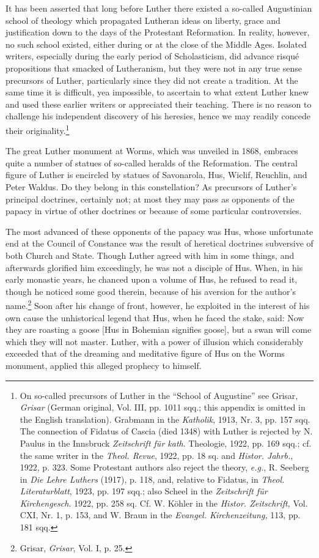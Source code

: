 It has been asserted that long before Luther there existed a so-called Augustinian
school of theology which propagated Lutheran
ideas on liberty, grace and justification down to the days of the
Protestant Reformation. In reality, however, no such school existed,
either during or at the close of the Middle Ages. Isolated writers,
especially during the early period of Scholasticism, did advance risqué
propositions that smacked of Lutheranism, but they were not in
any true sense precursors of Luther, particularly since they did not
create a tradition. At the same time it is difficult, yea impossible,
to ascertain to what extent Luther knew and used these earlier
writers or appreciated their teaching. There is no reason to challenge
his independent discovery of his heresies, hence we may readily concede
their originality.\footnote{On so-called precursors of Luther in the “School of Augustine” see Grisar, \textit{Grisar}
(German original, Vol. III, pp. 1011 sqq.; this appendix is omitted in the English translation).
Grabmann in the \textit{Katholik}, 1913, Nr. 3, pp. 157 sqq. The connection of Fidatus
of Cascia (died 1348) with Luther is rejected by N. Paulus in the Innsbruck \textit{Zeitschrift
für kath}. Theologie, 1922, pp. 169 sqq.; cf. the same writer in the \textit{Theol. Revue}, 1922,
pp. 18 sq. and \textit{Histor. Jahrb.}, 1922, p. 323. Some Protestant authors also reject the theory,
\textit{e.g.}, R. Seeberg in \textit{Die Lehre Luthers} (1917), p. 118, and, relative to Fidatus, in \textit{Theol.
Literaturblatt}, 1923, pp. 197 sqq.; also Scheel in the \textit{Zeitschrift für Kirchengesch}. 1922,
pp. 258 sq. Cf. W. Köhler in the \textit{Histor. Zeitschrift,} Vol. CXI, Nr. 1, p. 153, and W.
Braun in the \textit{Evangel. Kirchenzeitung,} 113, pp. 181 sqq.
}

The great Luther monument at Worms, which was unveiled in
1868, embraces quite a number of statues of so-called heralds of
the Reformation. The central figure of Luther is encircled by
statues of Savonarola, Hus, Wiclif, Reuchlin, and Peter Waldus.
Do they belong in this constellation? As precursors of Luther’s principal
doctrines, certainly not; at most they may pass as opponents
of the papacy in virtue of other doctrines or because of some particular
controversies.

The most advanced of these opponents of the papacy was Hus,
whose unfortunate end at the Council of Constance was the result
of heretical doctrines subversive of both Church and State. Though
Luther agreed with him in some things, and afterwards glorified him
exceedingly, he was not a disciple of Hus. When, in his early monastic
years, he chanced upon a volume of Hus, he refused to read
it, though he noticed some good therein, because of his aversion
for the author’s name.\footnote{Grisar, \textit{Grisar}, Vol. I, p. 25.}
Soon after his change of front, however,
he exploited in the interest of his own cause the unhistorical legend
that Hus, when he faced the stake, said: Now they are roasting a
goose [Hus in Bohemian signifies goose], but a swan will come which
they will not master. Luther, with a power of illusion which considerably
exceeded that of the dreaming and meditative figure of
Hus on the Worms monument, applied this alleged prophecy to
himself.

